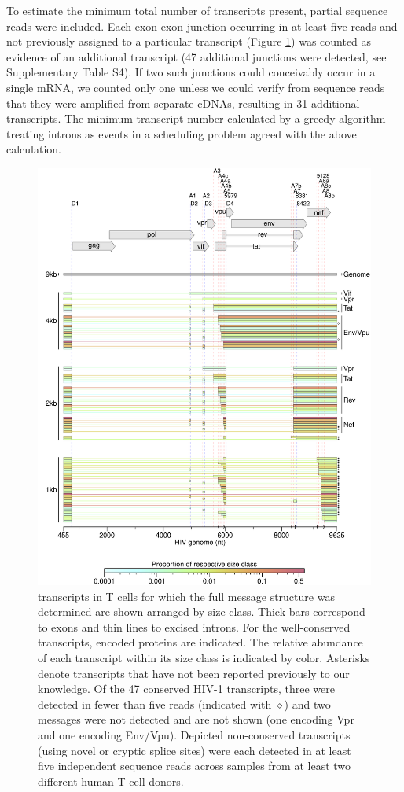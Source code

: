 \documentclass[../sherrill-Mix_thesis.tex]{subfiles}
\begin{document}
To estimate the minimum total number of transcripts present, partial sequence reads were included. Each exon-exon junction occurring in at least five reads and not previously assigned to a particular transcript (Figure \ref{figTranscripts}) was counted as evidence of an additional transcript (47 additional junctions were detected, see Supplementary Table S4). If two such junctions could conceivably occur in a single mRNA, we counted only one unless we could verify from sequence reads that they were amplified from separate cDNAs, resulting in 31 additional transcripts. The minimum transcript number calculated by a greedy algorithm treating introns as events in a scheduling problem agreed with the above calculation. 

\begin{figure}
	\centering
	\includegraphics[width=.9\textwidth]{2.pdf}
	\caption[Spliced transcripts produced from \hivEight{}]{\hivEight{} transcripts in T cells for which the full message structure was determined are shown arranged by size class. Thick bars correspond to exons and thin lines to excised introns. For the well-conserved transcripts, encoded proteins are indicated. The relative abundance of each transcript within its size class is indicated by color. Asterisks denote transcripts that have not been reported previously to our knowledge. Of the 47 conserved HIV-1 transcripts, three were detected in fewer than five reads (indicated with $\diamond$) and two messages were not detected and are not shown (one encoding Vpr and one encoding Env/Vpu). Depicted non-conserved transcripts (using novel or cryptic splice sites) were each detected in at least five independent sequence reads across samples from at least two different human T-cell donors.}
	\label{figTranscripts}
\end{figure}
\end{document}
